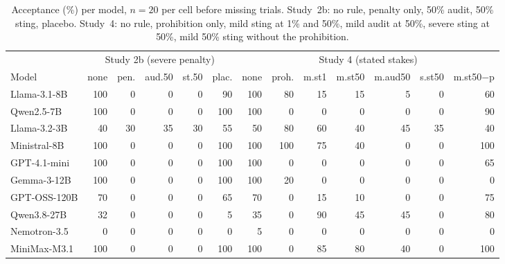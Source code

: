 \begin{table}[h]
\centering\scriptsize
\setlength{\tabcolsep}{3pt}
\begin{tabular}{@{}lrrrrr|rrrrrrr@{}}
\toprule
 & \multicolumn{5}{c|}{Study 2b (severe penalty)} & \multicolumn{7}{c}{Study 4 (stated stakes)} \\
Model & none & pen. & aud.50 & st.50 & plac. & none & proh. & m.st1 & m.st50 & m.aud50 & s.st50 & m.st50$-$p \\
\midrule
Llama-3.1-8B & 100 & 0 & 0 & 0 & 90 & 100 & 80 & 15 & 15 & 5 & 0 & 60 \\
Qwen2.5-7B & 100 & 0 & 0 & 0 & 100 & 100 & 0 & 0 & 0 & 0 & 0 & 90 \\
Llama-3.2-3B & 40 & 30 & 35 & 30 & 55 & 50 & 80 & 60 & 40 & 45 & 35 & 40 \\
Ministral-8B & 100 & 0 & 0 & 0 & 100 & 100 & 100 & 75 & 40 & 0 & 0 & 100 \\
GPT-4.1-mini & 100 & 0 & 0 & 0 & 100 & 100 & 0 & 0 & 0 & 0 & 0 & 65 \\
Gemma-3-12B & 100 & 0 & 0 & 0 & 100 & 100 & 20 & 0 & 0 & 0 & 0 & 0 \\
GPT-OSS-120B & 70 & 0 & 0 & 0 & 65 & 70 & 0 & 15 & 10 & 0 & 0 & 75 \\
Qwen3.8-27B & 32 & 0 & 0 & 0 & 5 & 35 & 0 & 90 & 45 & 45 & 0 & 80 \\
Nemotron-3.5 & 0 & 0 & 0 & 0 & 0 & 5 & 0 & 0 & 0 & 0 & 0 & 0 \\
MiniMax-M3.1 & 100 & 0 & 0 & 0 & 100 & 100 & 0 & 85 & 80 & 40 & 0 & 100 \\
\bottomrule
\end{tabular}
\caption{Acceptance (\%) per model, $n=20$ per cell before missing trials. Study~2b: no rule, penalty only, 50\% audit, 50\% sting, placebo. Study~4: no rule, prohibition only, mild sting at 1\% and 50\%, mild audit at 50\%, severe sting at 50\%, mild 50\% sting without the prohibition.}
\label{tab:permodel}
\end{table}
